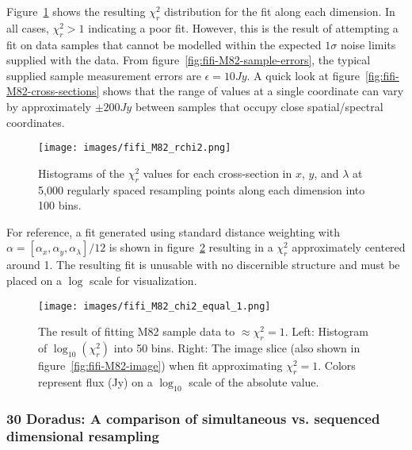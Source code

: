 \newpage

Figure~\ref{fig:fifi-M82-rchi2} shows the resulting $\chi_r^2$ distribution
for the fit along each dimension.
In all cases, $\chi_r^2 > 1$ indicating a poor fit.
However, this is the result of attempting a fit on data samples that cannot be
modelled within the expected $1\sigma$ noise limits supplied with the data.
From figure~\ref{fig:fifi-M82-sample-errors}, the typical supplied sample
measurement errors are $\epsilon=10 Jy$.
A quick look at figure~\ref{fig:fifi-M82-cross-sections} shows that the range
of values at a single coordinate can vary by approximately $\pm 200 Jy$ between
samples that occupy close spatial/spectral coordinates.

\begin{figure}[H]
  \begin{center}
  \texttt{[image: images/fifi\_M82\_rchi2.png]}
  \caption{Histograms of the $\chi_r^2$ values for each cross-section in $x$,
  $y$, and $\lambda$ at 5,000 regularly spaced resampling points
  along each dimension into 100 bins.}
  \label{fig:fifi-M82-rchi2}
  \end{center}
\end{figure}

For reference, a fit generated using standard distance weighting with
$\alpha = [\alpha_x, \alpha_y, \alpha_{\lambda}] / 12$ is shown in
figure~\ref{fig:fifi-M82-rchi2-equal-1} resulting in a $\chi_r^2$ approximately
centered around 1.
The resulting fit is unusable with no discernible structure and must be placed
on a $\log$ scale for visualization.

\begin{figure}[H]
  \begin{center}
  \texttt{[image: images/fifi\_M82\_chi2\_equal\_1.png]}
  \caption{The result of fitting M82 sample data to $\approx \chi_r^2=1$.
           Left: Histogram of $\log_{10}(\chi_r^2)$ into 50 bins.
           Right: The image slice (also shown in
           figure~\ref{fig:fifi-M82-image}) when fit approximating
           $\chi_r^2=1$.  Colors represent flux (Jy) on a $\log_{10}$ scale
           of the absolute value.}
  \label{fig:fifi-M82-rchi2-equal-1}
  \end{center}
\end{figure}

\clearpage
\newpage

\subsubsection{30 Doradus: A comparison of simultaneous vs. sequenced
               dimensional resampling}

